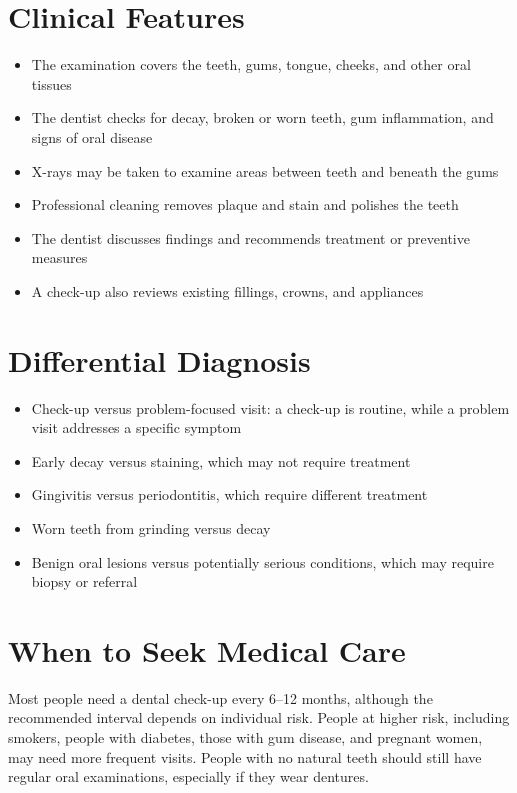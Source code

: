 \section*{Clinical Features}
\begin{itemize}
    \item The examination covers the teeth, gums, tongue, cheeks, and other oral tissues
    \item The dentist checks for decay, broken or worn teeth, gum inflammation, and signs of oral disease
    \item X-rays may be taken to examine areas between teeth and beneath the gums
    \item Professional cleaning removes plaque and stain and polishes the teeth
    \item The dentist discusses findings and recommends treatment or preventive measures
    \item A check-up also reviews existing fillings, crowns, and appliances
\end{itemize}

\section*{Differential Diagnosis}
\begin{itemize}
    \item Check-up versus problem-focused visit: a check-up is routine, while a problem visit addresses a specific symptom
    \item Early decay versus staining, which may not require treatment
    \item Gingivitis versus periodontitis, which require different treatment
    \item Worn teeth from grinding versus decay
    \item Benign oral lesions versus potentially serious conditions, which may require biopsy or referral
\end{itemize}

\section*{When to Seek Medical Care}
Most people need a dental check-up every 6--12 months, although the recommended interval depends on individual risk. People at higher risk, including smokers, people with diabetes, those with gum disease, and pregnant women, may need more frequent visits. People with no natural teeth should still have regular oral examinations, especially if they wear dentures.

